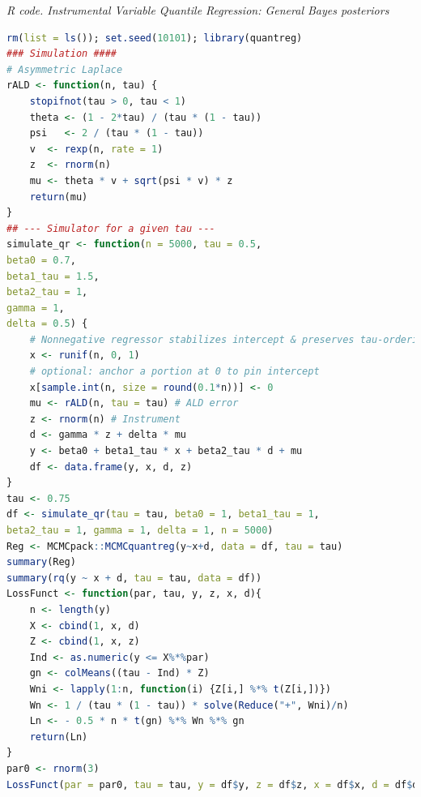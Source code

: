 \begin{enumerate}[leftmargin=*]
\begin{tcolorbox}[enhanced,width=4.67in,center upper,
	fontupper=\large\bfseries,drop shadow southwest,sharp corners]
	\textit{R code. Instrumental Variable Quantile Regression: General Bayes posteriors}
	\begin{VF}
		\begin{lstlisting}[language=R]
rm(list = ls()); set.seed(10101); library(quantreg)
### Simulation ####
# Asymmetric Laplace
rALD <- function(n, tau) {
	stopifnot(tau > 0, tau < 1)
	theta <- (1 - 2*tau) / (tau * (1 - tau))
	psi   <- 2 / (tau * (1 - tau))
	v  <- rexp(n, rate = 1)
	z  <- rnorm(n)
	mu <- theta * v + sqrt(psi * v) * z
	return(mu)
}
## --- Simulator for a given tau ---
simulate_qr <- function(n = 5000, tau = 0.5,
beta0 = 0.7,
beta1_tau = 1.5,
beta2_tau = 1,
gamma = 1,
delta = 0.5) {
	# Nonnegative regressor stabilizes intercept & preserves tau-ordering of slopes
	x <- runif(n, 0, 1)
	# optional: anchor a portion at 0 to pin intercept
	x[sample.int(n, size = round(0.1*n))] <- 0
	mu <- rALD(n, tau = tau) # ALD error
	z <- rnorm(n) # Instrument
	d <- gamma * z + delta * mu
	y <- beta0 + beta1_tau * x + beta2_tau * d + mu
	df <- data.frame(y, x, d, z)
}
tau <- 0.75
df <- simulate_qr(tau = tau, beta0 = 1, beta1_tau = 1,
beta2_tau = 1, gamma = 1, delta = 1, n = 5000)
Reg <- MCMCpack::MCMCquantreg(y~x+d, data = df, tau = tau)
summary(Reg)
summary(rq(y ~ x + d, tau = tau, data = df))
LossFunct <- function(par, tau, y, z, x, d){
	n <- length(y)
	X <- cbind(1, x, d)
	Z <- cbind(1, x, z)
	Ind <- as.numeric(y <= X%*%par) 
	gn <- colMeans((tau - Ind) * Z)
	Wni <- lapply(1:n, function(i) {Z[i,] %*% t(Z[i,])}) 
	Wn <- 1 / (tau * (1 - tau)) * solve(Reduce("+", Wni)/n)
	Ln <- - 0.5 * n * t(gn) %*% Wn %*% gn
	return(Ln)
}
par0 <- rnorm(3)
LossFunct(par = par0, tau = tau, y = df$y, z = df$z, x = df$x, d = df$d)
\end{lstlisting}
	\end{VF}
\end{tcolorbox} 


\end{enumerate}
